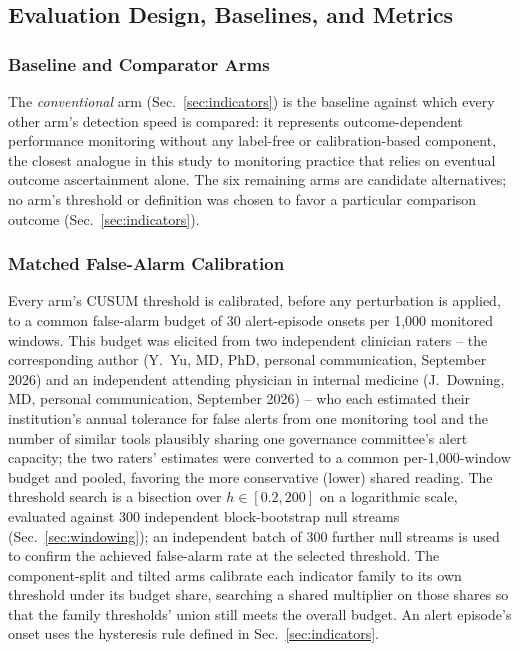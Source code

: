\documentclass[preprintsapa,article,submit,oneauthor]{Definitions/mdpi}
\begin{document}
\subsection{Evaluation Design, Baselines, and Metrics}\label{sec:calibration}

\subsubsection{Baseline and Comparator Arms}

The \emph{conventional} arm (Sec.~\ref{sec:indicators}) is the baseline against which every other arm's detection speed is compared: it represents outcome-dependent performance monitoring without any label-free or calibration-based component, the closest analogue in this study to monitoring practice that relies on eventual outcome ascertainment alone. The six remaining arms are candidate alternatives; no arm's threshold or definition was chosen to favor a particular comparison outcome (Sec.~\ref{sec:indicators}).

\subsubsection{Matched False-Alarm Calibration}

Every arm's CUSUM threshold is calibrated, before any perturbation is applied, to a common false-alarm budget of 30 alert-episode onsets per 1{,}000 monitored windows. This budget was elicited from two independent clinician raters -- the corresponding author (Y.~Yu, MD, PhD, personal communication, September 2026) and an independent attending physician in internal medicine (J.~Downing, MD, personal communication, September 2026) -- who each estimated their institution's annual tolerance for false alerts from one monitoring tool and the number of similar tools plausibly sharing one governance committee's alert capacity; the two raters' estimates were converted to a common per-1{,}000-window budget and pooled, favoring the more conservative (lower) shared reading. The threshold search is a bisection over $h \in [0.2, 200]$ on a logarithmic scale, evaluated against 300 independent block-bootstrap null streams (Sec.~\ref{sec:windowing}); an independent batch of 300 further null streams is used to confirm the achieved false-alarm rate at the selected threshold. The component-split and tilted arms calibrate each indicator family to its own threshold under its budget share, searching a shared multiplier on those shares so that the family thresholds' union still meets the overall budget. An alert episode's onset uses the hysteresis rule defined in Sec.~\ref{sec:indicators}.
\end{document}
